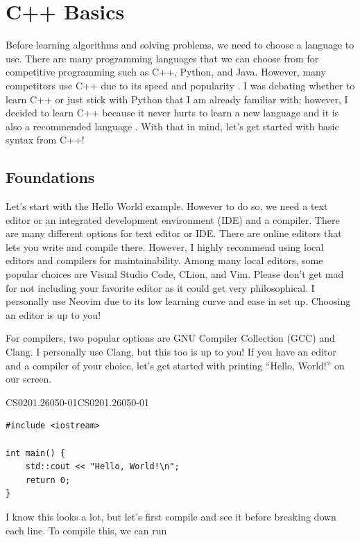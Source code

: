 \documentclass[../../main.tex]{subfiles}
\begin{document}
\chapter{C++ Basics}

Before learning algorithms and solving problems, we need to choose
a language to use. There are many programming languages that we can
choose from for competitive programming such as C++, Python, and Java.
However, many competitors use C++ due to its speed and popularity
\cite{CS02-2}. I was debating whether to learn C++ or just stick with
Python that I am already familiar with; however, I decided to learn
C++ because it never hurts to learn a new language and it is also a
recommended language \cite{CS02-3}. With that in mind, let's get
started with basic syntax from C++!

\section{Foundations}

Let's start with the Hello World example. However to do so, we need
a text editor or an integrated development environment (IDE) and a
compiler. There are many different options for text editor or IDE.
There are online editors that lets you write and compile there.
However, I highly recommend using local editors and compilers for
maintainability. Among many local editors, some popular choices
are Visual Studio Code, CLion, and Vim. Please don't get mad for not
including your favorite editor as it could get very philosophical.
I personally use Neovim due to its low learning curve and ease in
set up. Choosing an editor is up to you!

For compilers, two popular options are GNU Compiler Collection (GCC)
and Clang. I personally use Clang, but this too is up to you!
If you have an editor and a compiler of your choice, let's get
started with printing ``Hello, World!'' on our screen.

\begin{cppbox}{CS0201.26050-01}{CS0201.26050-01}
\begin{lstlisting}[style=cppstyle]
#include <iostream>

int main() {
    std::cout << "Hello, World!\n";
    return 0;
}
\end{lstlisting}
\end{cppbox}

I know this looks a lot, but let's first compile and see it before
breaking down each line. To compile this, we can run
\end{document}
